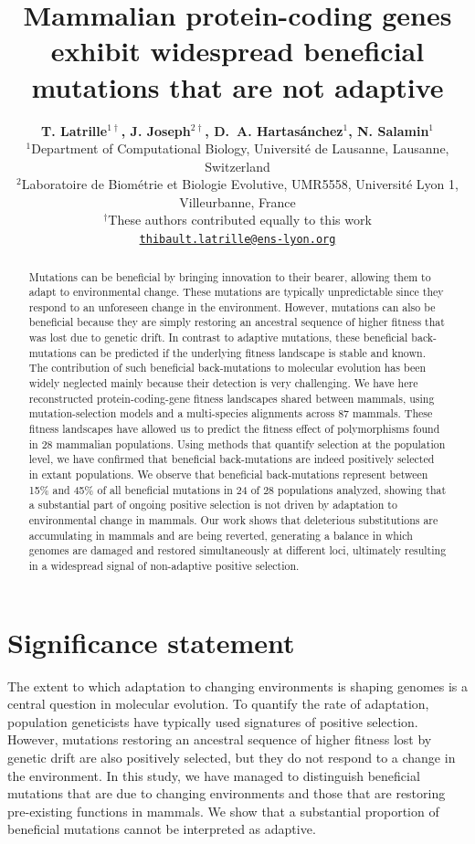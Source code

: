 \documentclass{article}
\title{Mammalian protein-coding genes exhibit widespread beneficial mutations that are not adaptive}
\author{
    \large
    \textbf{T. {Latrille}$^{1\dag}$\orcidlink{0000-0002-9643-4668}, J. {Joseph}$^{2\dag}$\orcidlink{0009-0002-1312-9930}, D.~A. {Hartasánchez}$^{1}$\orcidlink{0000-0003-2596-6883}, N. {Salamin}$^{1}$\orcidlink{0000-0002-3963-4954}}\\
    \normalsize
    $^{1}$Department of Computational Biology, Université de Lausanne, Lausanne, Switzerland\\
    $^{2}$Laboratoire de Biométrie et Biologie Evolutive, UMR5558, Université Lyon 1, Villeurbanne, France \\
    $^{\dag}$These authors contributed equally to this work\\
    \texttt{\href{mailto:thibault.latrille@ens-lyon.org}{thibault.latrille@ens-lyon.org}} \\
}
\begin{document}
    \maketitle

    \begin{abstract}
        Mutations can be beneficial by bringing innovation to their bearer, allowing them to adapt to environmental change. These mutations are typically unpredictable since they respond to an unforeseen change in the environment. However, mutations can also be beneficial because they are simply restoring an ancestral sequence of higher fitness that was lost due to genetic drift. In contrast to adaptive mutations, these beneficial back-mutations can be predicted if the underlying fitness landscape is stable and known. The contribution of such beneficial back-mutations to molecular evolution has been widely neglected mainly because their detection is very challenging. We have here reconstructed protein-coding-gene fitness landscapes shared between mammals, using mutation-selection models and a multi-species alignments across 87 mammals. These fitness landscapes have allowed us to predict the fitness effect of polymorphisms found in 28 mammalian populations. Using methods that quantify selection at the population level, we have confirmed that beneficial back-mutations are indeed positively selected in extant populations. We observe that beneficial back-mutations represent between 15\% and 45\% of all beneficial mutations in 24 of 28 populations analyzed, showing that a substantial part of ongoing positive selection is not driven by adaptation to environmental change in mammals. Our work shows that deleterious substitutions are accumulating in mammals and are being reverted, generating a balance in which genomes are damaged and restored simultaneously at different loci, ultimately resulting in a widespread signal of non-adaptive positive selection.
    \end{abstract}


    \section*{Significance statement}
    The extent to which adaptation to changing environments is shaping genomes is a central question in molecular evolution. To quantify the rate of adaptation, population geneticists have typically used signatures of positive selection. However, mutations restoring an ancestral sequence of higher fitness lost by genetic drift are also positively selected, but they do not respond to a change in the environment. In this study, we have managed to distinguish beneficial mutations that are due to changing environments and those that are restoring pre-existing functions in mammals. We show that a substantial proportion of beneficial mutations cannot be interpreted as adaptive.
\end{document}
